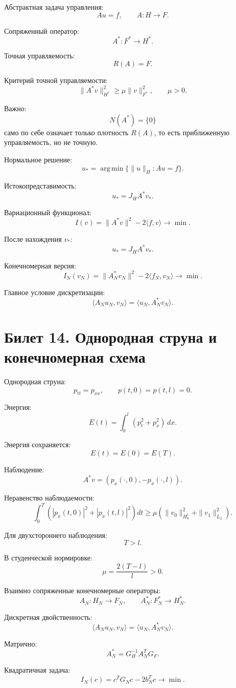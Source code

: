 \documentclass[12pt,a4paper]{article}
\begin{document}
Абстрактная задача управления:
\[
 Au=f,
 \qquad
 A:H\to F.
\]

Сопряженный оператор:
\[
 A^*:F^*\to H^*.
\]

Точная управляемость:
\[
 R(A)=F.
\]

Критерий точной управляемости:
\[
 \|A^*v\|_{H^*}^2
 \ge
 \mu\|v\|_{F^*}^2,
 \qquad \mu>0.
\]

Важно:
\[
 N(A^*)=\{0\}
\]
само по себе означает только плотность $R(A)$, то есть приближенную управляемость, но не точную.

Нормальное решение:
\[
 u_*=
 \operatorname*{arg\,min}\{\|u\|_H: Au=f\}.
\]

Истокопредставимость:
\[
 u_*=J_HA^*v_*.
\]

Вариационный функционал:
\[
 I(v)=\|A^*v\|^2-2\langle f,v\rangle\to\min.
\]

После нахождения $v_*$:
\[
 u_*=J_HA^*v_*.
\]

Конечномерная версия:
\[
 I_N(v_N)=\|A_N^*v_N\|^2-2\langle f_N,v_N\rangle\to\min.
\]

Главное условие дискретизации:
\[
 \langle A_Nu_N,v_N\rangle
 =
 \langle u_N,A_N^*v_N\rangle.
\]

\section*{Билет 14. Однородная струна и конечномерная схема}

Однородная струна:
\[
 p_{tt}=p_{xx},
 \qquad p(t,0)=p(t,l)=0.
\]

Энергия:
\[
 E(t)=\int_0^l(p_t^2+p_x^2)\,dx.
\]

Энергия сохраняется:
\[
 E(t)=E(0)=E(T).
\]

Наблюдение:
\[
 A^*v=(p_x(\cdot,0),-p_x(\cdot,l)).
\]

Неравенство наблюдаемости:
\[
 \int_0^T\left(|p_x(t,0)|^2+|p_x(t,l)|^2\right)dt
 \ge
 \mu\left(\|v_0\|_{H_0^1}^2+\|v_1\|_{L_2}^2\right).
\]

Для двухстороннего наблюдения:
\[
 T>l.
\]

В студенческой нормировке:
\[
 \mu=\frac{2(T-l)}{l}>0.
\]

Взаимно сопряженные конечномерные операторы:
\[
 A_N:H_N\to F_N,
 \qquad
 A_N^*:F_N^*\to H_N^*.
\]

Дискретная двойственность:
\[
 \langle A_Nu_N,v_N\rangle
 =
 \langle u_N,A_N^*v_N\rangle.
\]

Матрично:
\[
 A_N^*=G_H^{-1}A_N^TG_F.
\]

Квадратичная задача:
\[
 I_N(c)=c^TG_Nc-2b_N^Tc\to\min.
\]
\end{document}
